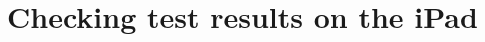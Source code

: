 \documentclass{article}
\begin{document}
\section{Checking test results on the iPad}
\label{sec-onIpadAnalysis}

\begin{figure}
\begin{center}

\end{center}
\end{figure}
\end{document}

